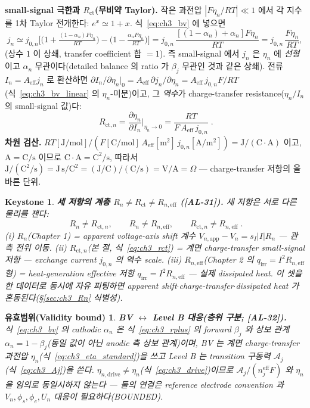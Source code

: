 \documentclass[11pt,a4paper]{article}
\newtheorem*{boundbox}{유효범위(Validity bound)}
\newtheorem*{keybox}{Keystone}
\newcommand{\eff}{\mathrm{eff}}
\newcommand{\app}{\mathrm{app}}
\newcommand{\drive}{\mathrm{drive}}
\newcommand{\irr}{\mathrm{irr}}
\newcommand{\ct}{\mathrm{ct}}
\newcommand{\AL}[1]{\textsf{[AL-#1]}}
\begin{document}
\textbf{small-signal 극한과 $R_\ct$(무비약 Taylor).} 작은 과전압 $|F\eta_n/RT|\ll1$ 에서 각 지수를 1차 Taylor
전개한다: $e^{x}\simeq1+x$. 식~\eqref{eq:ch3_bv} 에 넣으면
\begin{equation}
j_n\simeq j_{0,n}\Big[\big(1+\tfrac{(1-\alpha_n)F\eta_n}{RT}\big)-\big(1-\tfrac{\alpha_n F\eta_n}{RT}\big)\Big]
=j_{0,n}\,\frac{[(1-\alpha_n)+\alpha_n]F\eta_n}{RT}=j_{0,n}\,\frac{F\eta_n}{RT},
\label{eq:ch3_bv_linear}
\end{equation}
(상수 $1$ 이 상쇄, transfer coefficient 합 $=1$). 즉 small-signal 에서 $j_n$ 은 $\eta_n$ 에 \emph{선형}이고
$\alpha_n$ 무관이다(detailed balance 의 ratio 가 $\beta_j$ 무관인 것과 같은 상쇄). 전류 $I_n=A_\eff j_n$ 로
환산하면 $\partial I_n/\partial\eta_n|_0=A_\eff\,\partial j_n/\partial\eta_n=A_\eff\,j_{0,n}F/RT$(식~\eqref{eq:ch3_bv_linear}
의 $\eta_n$-미분)이고, 그 \emph{역수}가 charge-transfer resistance($\eta_n/I_n$ 의 small-signal 값)다:
\begin{equation}
\boxed{\;R_{\ct,n}=\frac{\partial\eta_n}{\partial I_n}\Big|_{\eta_n\to0}=\frac{RT}{F\,A_\eff\,j_{0,n}}\;.}
\label{eq:ch3_rct}
\end{equation}
\textbf{차원 검산.} $RT[\mathrm{J/mol}]/(F[\mathrm{C/mol}]\,A_\eff[\mathrm{m^2}]\,j_{0,n}[\mathrm{A/m^2}])
=\mathrm{J}/(\mathrm{C}\cdot\mathrm{A})$ 이고, $\mathrm{A}=\mathrm{C/s}$ 이므로 $\mathrm{C\cdot A}=\mathrm{C^2/s}$,
따라서 $\mathrm J/(\mathrm{C^2/s})=\mathrm{J\,s/C^2}=(\mathrm{J/C})/(\mathrm{C/s})=\mathrm{V/A}=\Omega$
— charge-transfer 저항의 올바른 단위.
\begin{keybox}
\textbf{세 저항의 계층 $R_n\ne R_\ct\ne R_{n,\eff}$ (\AL{31}).} 세 저항은 \emph{서로 다른 물리}를 잰다:
\begin{equation}
\boxed{\;R_n\ne R_{\ct,n},\qquad R_n\ne R_{n,\eff},\qquad R_{\ct,n}\ne R_{n,\eff}\;.}
\label{eq:ch3_Rn_not_equal}
\end{equation}
(i) $R_n$(Chapter 1) = apparent \emph{voltage-axis shift} 계수 $V_{n,\app}-V_n=s_I|I|R_n$ — 관측 전위 이동.
(ii) $R_{\ct,n}$(본 절, 식~\eqref{eq:ch3_rct}) = 계면 \emph{charge-transfer} small-signal 저항 — exchange
current $j_{0,n}$ 의 역수 scale. (iii) $R_{n,\eff}$(Chapter 2 의 $q_\irr=I^2R_{n,\eff}$ 형) = \emph{heat-generation}
effective 저항 $q_\irr=I^2R_{n,\eff}$ — 실제 dissipated heat. 이 셋을 한 데이터로 동시에 자유 피팅하면 apparent
shift$\cdot$charge-transfer$\cdot$dissipated heat 가 혼동된다(\S\ref{sec:ch3_Rn} 식별성).
\end{keybox}
\begin{boundbox}
\textbf{BV $\leftrightarrow$ Level B 대응(층위 구분; \AL{32}).} 식~\eqref{eq:ch3_bv} 의 cathodic $\alpha_n$ 은
식~\eqref{eq:ch3_rplus} 의 forward $\beta_j$ 와 \emph{상보} 관계 $\alpha_n=1-\beta_j$(동일 \emph{값}이 아닌 anodic 측
상보 \emph{관계})이며, BV 는 \emph{계면 charge-transfer}
과전압 $\eta_n$(식~\eqref{eq:ch3_eta_standard})을 쓰고 Level B 는 \emph{transition} 구동력 $\mathcal A_j$
(식~\eqref{eq:ch3_Aj})을 쓴다. $\eta_{n,\drive}\ne\eta_n$(식~\eqref{eq:ch3_drive})이므로 $\mathcal A_j/(n_j^\eff F)$
와 $\eta_n$ 을 임의로 동일시하지 않는다 — 둘의 연결은 reference electrode convention 과 $V_n,\phi_s,\phi_e,U_n$
대응이 필요하다(BOUNDED).
\end{boundbox}
\end{document}
